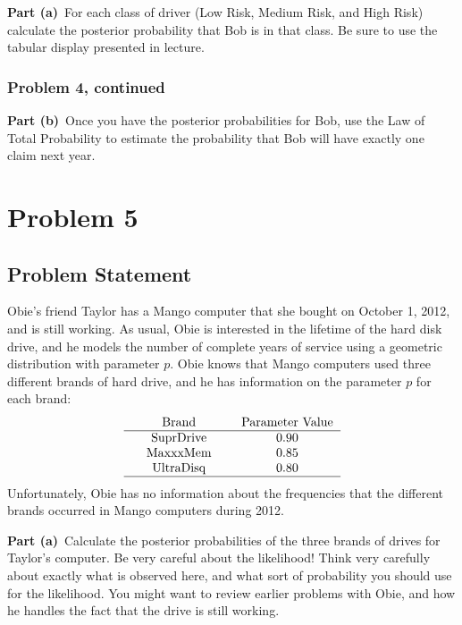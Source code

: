\documentclass[12pt]{article}
\theoremstyle{definition}
\begin{document}
\noindent
{\bf Part (a)}\ For each class of driver (Low Risk, Medium Risk, and High Risk) calculate the posterior probability that Bob is in that class. Be sure to use the tabular display presented in lecture.

\newpage
\subsubsection*{Problem 4, continued}
\noindent
{\bf Part (b)}\ Once you have the posterior probabilities for Bob, use the Law of Total Probability to estimate the probability that Bob will have exactly one claim next year.

\newpage
\section*{Problem 5}



\subsection*{Problem Statement}

Obie's friend Taylor has a Mango computer that she bought on October 1, 2012, and is still working. As usual, Obie is interested in the lifetime of the hard disk drive, and he models the number of complete years of service using a geometric distribution with parameter $p$. Obie knows that Mango computers used three different brands of hard drive, and he has information on the parameter $p$ for each brand:
$$
\begin{tabular}{ccccc}
& Brand & & Parameter Value\\
\hline
& SuprDrive & & 0.90\\
& MaxxxMem & & 0.85\\
& UltraDisq & & 0.80\\
\hline 
\end{tabular}
$$
Unfortunately, Obie has no information about the frequencies that the different brands occurred in Mango computers during 2012.

\bigskip
\noindent
{\bf Part (a)}\ Calculate the posterior probabilities of the three brands of drives for Taylor's computer. Be very careful about the likelihood! Think very carefully about exactly what is observed here, and what sort of probability you should use for the likelihood. You might want to review earlier problems with Obie, and how he handles the fact that the drive is still working.
\end{document}
